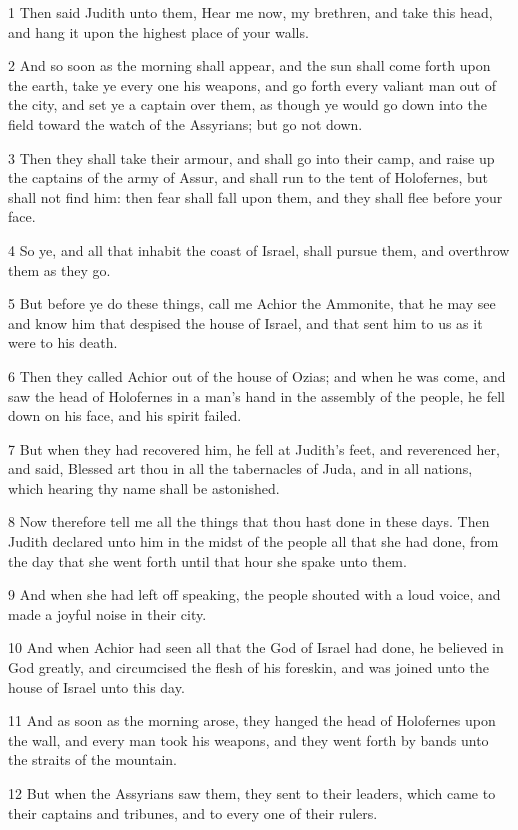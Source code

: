 \par 1 Then said Judith unto them, Hear me now, my brethren, and take this head, and hang it upon the highest place of your walls.
\par 2 And so soon as the morning shall appear, and the sun shall come forth upon the earth, take ye every one his weapons, and go forth every valiant man out of the city, and set ye a captain over them, as though ye would go down into the field toward the watch of the Assyrians; but go not down.
\par 3 Then they shall take their armour, and shall go into their camp, and raise up the captains of the army of Assur, and shall run to the tent of Holofernes, but shall not find him: then fear shall fall upon them, and they shall flee before your face.
\par 4 So ye, and all that inhabit the coast of Israel, shall pursue them, and overthrow them as they go.
\par 5 But before ye do these things, call me Achior the Ammonite, that he may see and know him that despised the house of Israel, and that sent him to us as it were to his death.
\par 6 Then they called Achior out of the house of Ozias; and when he was come, and saw the head of Holofernes in a man's hand in the assembly of the people, he fell down on his face, and his spirit failed.
\par 7 But when they had recovered him, he fell at Judith's feet, and reverenced her, and said, Blessed art thou in all the tabernacles of Juda, and in all nations, which hearing thy name shall be astonished.
\par 8 Now therefore tell me all the things that thou hast done in these days. Then Judith declared unto him in the midst of the people all that she had done, from the day that she went forth until that hour she spake unto them.
\par 9 And when she had left off speaking, the people shouted with a loud voice, and made a joyful noise in their city.
\par 10 And when Achior had seen all that the God of Israel had done, he believed in God greatly, and circumcised the flesh of his foreskin, and was joined unto the house of Israel unto this day.
\par 11 And as soon as the morning arose, they hanged the head of Holofernes upon the wall, and every man took his weapons, and they went forth by bands unto the straits of the mountain.
\par 12 But when the Assyrians saw them, they sent to their leaders, which came to their captains and tribunes, and to every one of their rulers.
